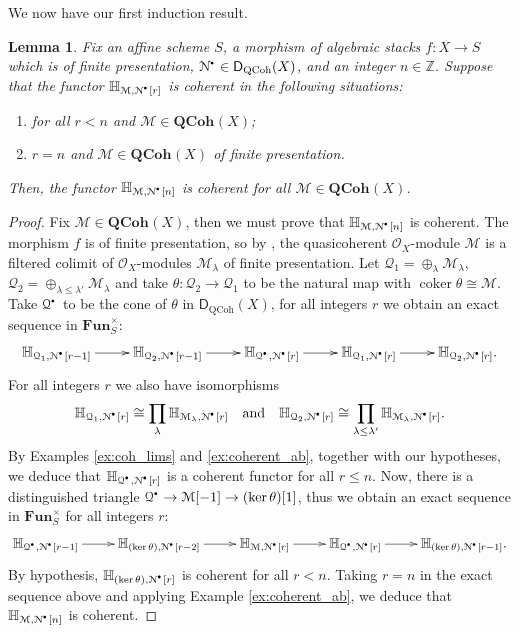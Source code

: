 \documentclass{amsart}
\theoremstyle{plain}
\newtheorem{lem}[thm]{Lemma}
\theoremstyle{definition}
\theoremstyle{remark}
\numberwithin{equation}{section}
\newcommand{\Z}{\mathbb{Z}}
\newcommand{\Orb}{\mathcal{O}}
\newcommand{\QCOHB}{\mathbf{QCoh}}
\newcommand{\QCOH}[2][]{\QCOHB^{#1}({#2})}
\DeclareMathOperator{\coker}{coker}
\newcommand{\DCAT}{\mathsf{D}}
\newcommand{\shv}[1]{\mathcal{{#1}}}
\newcommand{\FUNP}[1]{\mathbf{Fun}_{{#1}}^{\times}}
\newcommand{\E}[2]{\mathbb{H}_{{#1},{#2}}}
\newcommand{\DQCOH}{\DCAT_{\mathrm{QCoh}}}
\newcommand{\sbt}{\,\begin{picture}(-1,-1)(0,-2)\circle*{1.5}\end{picture}\ }
\newcommand{\cplx}[1]{\shv{{#1}}^{\sbt}}
\begin{document}
We now have our first induction result. 
\begin{lem}\label{lem:red_qcfp_F}
  Fix an affine scheme $S$, a morphism of algebraic stacks $f : X
  \to S$ which is of finite presentation, $\cplx{N} \in \DQCOH(X)$,
  and an integer $n\in \Z$. Suppose  
  that the functor $\E{\shv{M}}{\cplx{N}[r]}$ is coherent in the
  following situations:
  \begin{enumerate}
  \item for all $r<n$ and $\shv{M} \in \QCOH{X}$;
  \item $r=n$ and $\shv{M} \in \QCOH{X}$ of finite presentation.
  \end{enumerate}
  Then, the functor $\E{\shv{M}}{\cplx{N}[n]}$ is coherent for all
  $\shv{M}\in \QCOH{X}$. 
\end{lem}
\begin{proof}
  Fix $\shv{M} \in \QCOH{X}$, then we must prove that
  $\E{\shv{M}}{\cplx{N}[n]}$ is coherent. The morphism $f$ is of
  finite presentation, so by \cite[Thm.\ A]{rydh-2009}, the quasicoherent
  $\Orb_X$-module $\shv{M}$ is a filtered colimit of $\Orb_X$-modules
  $\shv{M}_\lambda$ of finite presentation. Let $\shv{Q}_1 = \oplus_\lambda
  \shv{M}_\lambda$, $\shv{Q}_2 = \oplus_{\lambda 
\leq \lambda'} \shv{M}_\lambda$ and take $\theta :
  \shv{Q}_2 \to \shv{Q}_1$ to be the natural map with $\coker \theta
  \cong \shv{M}$. Take $\cplx{Q}$ to be the cone of $\theta$ in
  $\DQCOH(X)$, for all integers $r$ we obtain an exact sequence in
  $\FUNP{S}$: 
  \[
  \xymatrix{\E{\shv{Q}_1}{\cplx{N}[r-1]} \ar[r] &
    \E{\shv{Q}_2}{\cplx{N}[r-1]} \ar[r] &
  \E{\cplx{Q}}{\cplx{N}[r]}  \ar[r] & \E{\shv{Q}_1}{\cplx{N}[r]} \ar[r] & 
  \E{\shv{Q}_2}{\cplx{N}[r]}.}
  \]
  For all integers $r$ we also have
  isomorphisms 
  \[
  \E{\shv{Q}_1}{\cplx{N}[r]} \cong \prod_\lambda \E{\shv{M}_\lambda}{\cplx{N}[r]}
  \quad \mbox{and} \quad \E{\shv{Q}_2}{\cplx{N}[r]} \cong
  \prod_{\lambda\leq \lambda'}
  \E{\shv{M}_\lambda}{\cplx{N}[r]}.
  \]
  By Examples \ref{ex:coh_lims} and \ref{ex:coherent_ab}, together
  with our hypotheses, we deduce that $\E{\cplx{Q}}{\cplx{N}[r]}$ is a
  coherent functor for all $r\leq n$. Now, there is a distinguished
  triangle $\cplx{Q} \to \shv{M}[-1] \to (\ker \theta)[1]$, thus we
  obtain an exact sequence in $\FUNP{S}$ for all integers $r$:
  \[
  \xymatrix{\E{\cplx{Q}}{\cplx{N}[r-1]} \ar[r] & \E{(\ker
      \theta)}{\cplx{N}[r-2]} \ar[r] & \E{\shv{M}}{\cplx{N}[r]} \ar[r] &
    \E{\cplx{Q}}{\cplx{N}[r]} \ar[r] & 
    \E{(\ker \theta)}{\cplx{N}[r-1]}.}
  \]
  By hypothesis, $\E{(\ker \theta)}{\cplx{N}[r]}$ is coherent for all
  $r<n$. Taking $r=n$ in the exact sequence above and applying Example
  \ref{ex:coherent_ab}, we deduce that $\E{\shv{M}}{\cplx{N}[n]}$ is
  coherent.
\end{proof}
\end{document}
